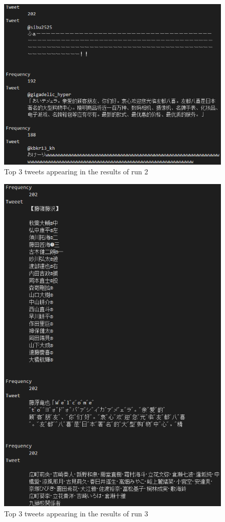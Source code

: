 \documentclass{../style/sig-alternate}
\begin{document}
\begin{figure}[t!]
\begin{center}
\includegraphics[width=120mm,bb=0 0 816 579]{../img/run2.png}
\caption{Top 3 tweets appearing in the results of run 2}
\label{fig:run2}
\end{center}
\end{figure}

\begin{figure}[t!]
\begin{center}
\includegraphics[width=120mm,bb=0 0 816 579]{../img/run3.png}
\caption{Top 3 tweets appearing in the results of run 3}
\label{fig:run3}
\end{center}
\end{figure}
\end{document}
